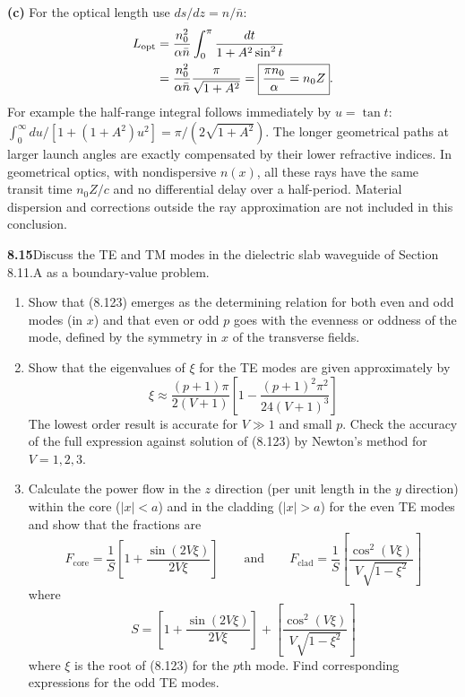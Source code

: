 \medskip\noindent\textbf{(c)} For the optical length use $ds/dz=n/\bar n$:
\begin{align*}
L_{\rm opt}
 &=\frac{n_0^2}{\alpha\bar n}
 \int_0^\pi\frac{dt}{1+A^2\sin^2t}\\
 &=\frac{n_0^2}{\alpha\bar n}
 \frac{\pi}{\sqrt{1+A^2}}
 =\boxed{\frac{\pi n_0}{\alpha}=n_0Z}.
\end{align*}
For example the half-range integral follows immediately by
$u=\tan t$:
$\int_0^\infty du/[1+(1+A^2)u^2]=\pi/(2\sqrt{1+A^2})$.
The longer geometrical paths at larger launch angles are exactly
compensated by their lower refractive indices.  In geometrical optics,
with nondispersive $n(x)$, all these rays have the same transit time
$n_0Z/c$ and no differential delay over a half-period.  Material
dispersion and corrections outside the ray approximation are not
included in this conclusion.

\par\bigskip
\noindent\textbf{8.15}\quad Discuss the TE and TM modes in the dielectric slab waveguide of Section 8.11.A as a boundary-value problem.
\begin{enumerate}
\item[(a)] Show that (8.123) emerges as the determining relation for both even and odd modes (in $x$) and that even or odd $p$ goes with the evenness or oddness of the mode, defined by the symmetry in $x$ of the transverse fields.
\item[(b)] Show that the eigenvalues of $\xi$ for the TE modes are given approximately by
\[
\xi\approx\frac{(p+1)\pi}{2(V+1)}\left[1-\frac{(p+1)^{2}\pi^{2}}{24(V+1)^{3}}\right]
\]
The lowest order result is accurate for $V\gg1$ and small $p$. Check the accuracy of the full expression against solution of (8.123) by Newton's method for $V=1,2,3$.
\item[(c)] Calculate the power flow in the $z$ direction (per unit length in the $y$ direction) within the core ($|x|<a$) and in the cladding ($|x|>a$) for the even TE modes and show that the fractions are
\[
F_{\mathrm{core}}=\frac{1}{S}\left[1+\frac{\sin(2V\xi)}{2V\xi}\right]\qquad\text{and}\qquad
F_{\mathrm{clad}}=\frac{1}{S}\left[\frac{\cos^{2}(V\xi)}{V\sqrt{1-\xi^{2}}}\right]
\]
where
\[
S=\left[1+\frac{\sin(2V\xi)}{2V\xi}\right]+\left[\frac{\cos^{2}(V\xi)}{V\sqrt{1-\xi^{2}}}\right]
\]
where $\xi$ is the root of (8.123) for the $p$th mode. Find corresponding expressions for the odd TE modes.
\end{enumerate}
\solution

